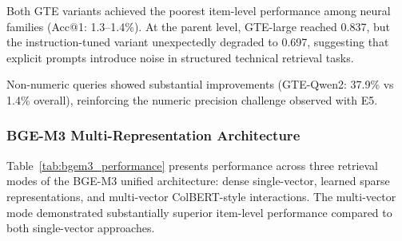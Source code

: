 \documentclass[preprint,12pt]{elsarticle}
\begin{document}
\begin{table}[htbp]
\centering
\caption{Performance comparison of GTE model variants with different query formulations.}
\label{tab:gte_performance}
\end{table}

Both GTE variants achieved the poorest item-level performance among neural families (Acc@1: 1.3--1.4\%). At the parent level, GTE-large reached 0.837, but the instruction-tuned variant unexpectedly degraded to 0.697, suggesting that explicit prompts introduce noise in structured technical retrieval tasks.

Non-numeric queries showed substantial improvements (GTE-Qwen2: 37.9\% vs 1.4\% overall), reinforcing the numeric precision challenge observed with E5.

\subsubsection{BGE-M3 Multi-Representation Architecture}

Table~\ref{tab:bgem3_performance} presents performance across three retrieval modes of the BGE-M3 unified architecture: dense single-vector, learned sparse representations, and multi-vector ColBERT-style interactions. The multi-vector mode demonstrated substantially superior item-level performance compared to both single-vector approaches.
\end{document}
